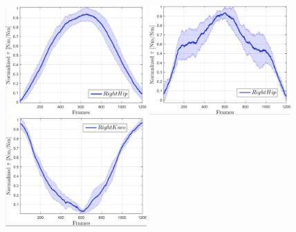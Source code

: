 %
 \begin{figure}[!ht]
	 \centering
		\includegraphics[width=0.48\textwidth]{figs/torqueRightHipBH}
 		\includegraphics[width=0.48\textwidth]{figs/torqueRightHipBHR}
   \includegraphics[width=0.48\textwidth]{figs/torqueRightKneeSH}

\end{figure}
